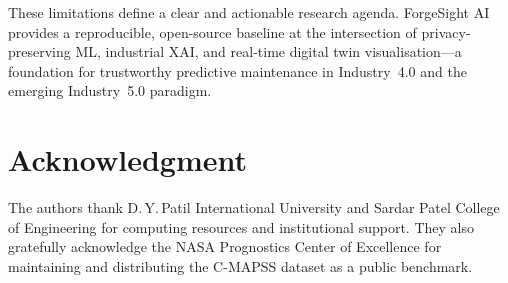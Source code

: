 \documentclass[10pt, journal, letterpaper]{IEEEtran}
\begin{document}
These limitations define a clear and actionable research agenda. ForgeSight AI
provides a reproducible, open-source baseline at the intersection of privacy-
preserving ML, industrial XAI, and real-time digital twin visualisation—a
foundation for trustworthy predictive maintenance in Industry~4.0 and the
emerging Industry~5.0 paradigm.

\section*{Acknowledgment}
The authors thank D.\,Y.\,Patil International University and Sardar Patel
College of Engineering for computing resources and institutional support.
They also gratefully acknowledge the NASA Prognostics Center of Excellence
for maintaining and distributing the C-MAPSS dataset as a public benchmark.
\end{document}

